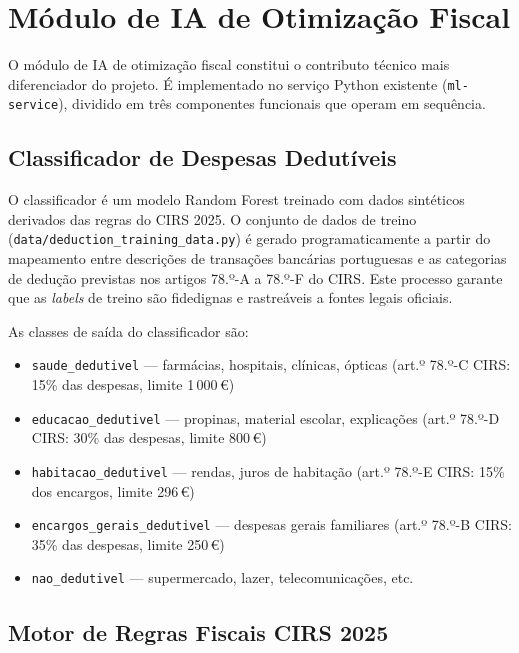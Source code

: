 

\section{Módulo de IA de Otimização Fiscal}
\label{sec:impl-fiscal-ia}

O módulo de \ac{IA} de otimização fiscal constitui o contributo técnico mais diferenciador do projeto. É implementado no serviço Python existente (\texttt{ml-service}), dividido em três componentes funcionais que operam em sequência.

\subsection{Classificador de Despesas Dedutíveis}
\label{sec:impl-deduction-classifier}

O classificador é um modelo Random Forest treinado com dados sintéticos derivados das regras do \ac{CIRS} 2025. O conjunto de dados de treino (\texttt{data/deduction\_training\_data.py}) é gerado programaticamente a partir do mapeamento entre descrições de transações bancárias portuguesas e as categorias de dedução previstas nos artigos 78.º-A a 78.º-F do \ac{CIRS}. Este processo garante que as \textit{labels} de treino são fidedignas e rastreáveis a fontes legais oficiais.

As classes de saída do classificador são:
\begin{itemize}
    \item \texttt{saude\_dedutivel} --- farmácias, hospitais, clínicas, ópticas (art.º 78.º-C \ac{CIRS}: 15\% das despesas, limite 1\,000\,€)
    \item \texttt{educacao\_dedutivel} --- propinas, material escolar, explicações (art.º 78.º-D \ac{CIRS}: 30\% das despesas, limite 800\,€)
    \item \texttt{habitacao\_dedutivel} --- rendas, juros de habitação (art.º 78.º-E \ac{CIRS}: 15\% dos encargos, limite 296\,€)
    \item \texttt{encargos\_gerais\_dedutivel} --- despesas gerais familiares (art.º 78.º-B \ac{CIRS}: 35\% das despesas, limite 250\,€)
    \item \texttt{nao\_dedutivel} --- supermercado, lazer, telecomunicações, etc.
\end{itemize}

\subsection{Motor de Regras Fiscais CIRS 2025}
\label{sec:impl-irs-engine}

